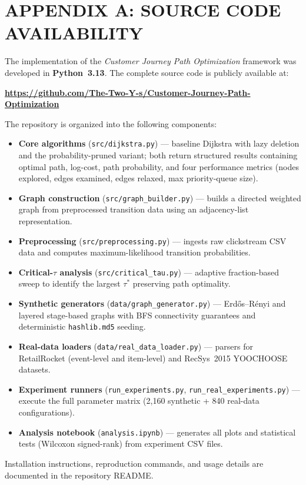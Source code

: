 \chapter*{APPENDIX A: SOURCE CODE AVAILABILITY}

The implementation of the \textit{Customer Journey Path Optimization} framework was developed in \textbf{Python~3.13}. The complete source code is publicly available at:

\smallskip
\centerline{\textbf{\url{https://github.com/The-Two-Y-s/Customer-Journey-Path-Optimization}}}
\smallskip

\noindent The repository is organized into the following components:

\begin{itemize}[nosep]
  \item \textbf{Core algorithms} (\texttt{src/dijkstra.py}) --- baseline Dijkstra with lazy deletion and the probability-pruned variant; both return structured results containing optimal path, log-cost, path probability, and four performance metrics (nodes explored, edges examined, edges relaxed, max priority-queue size).
  \item \textbf{Graph construction} (\texttt{src/graph\_builder.py}) --- builds a directed weighted graph from preprocessed transition data using an adjacency-list representation.
  \item \textbf{Preprocessing} (\texttt{src/preprocessing.py}) --- ingests raw clickstream CSV data and computes maximum-likelihood transition probabilities.
  \item \textbf{Critical-$\tau$ analysis} (\texttt{src/critical\_tau.py}) --- adaptive fraction-based sweep to identify the largest $\tau^*$ preserving path optimality.
  \item \textbf{Synthetic generators} (\texttt{data/graph\_generator.py}) --- Erd\H{o}s--R\'{e}nyi and layered stage-based graphs with BFS connectivity guarantees and deterministic \texttt{hashlib.md5} seeding.
  \item \textbf{Real-data loaders} (\texttt{data/real\_data\_loader.py}) --- parsers for RetailRocket (event-level and item-level) and RecSys~2015 YOOCHOOSE datasets.
  \item \textbf{Experiment runners} (\texttt{run\_experiments.py}, \texttt{run\_real\_experiments.py}) --- execute the full parameter matrix (2,160 synthetic + 840 real-data configurations).
  \item \textbf{Analysis notebook} (\texttt{analysis.ipynb}) --- generates all plots and statistical tests (Wilcoxon signed-rank) from experiment CSV files.
\end{itemize}

\noindent Installation instructions, reproduction commands, and usage details are documented in the repository README.
